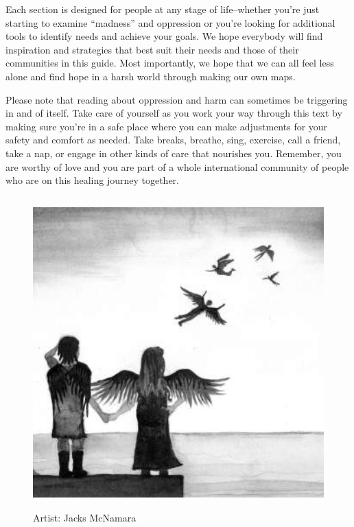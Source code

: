 Each  section  is  designed  for  people  at  any  stage  of  life--whether  you’re  just starting to examine “madness” and oppression or you’re looking for additional tools  to  identify  needs  and  achieve  your  goals.  We  hope  everybody  will  find inspiration and strategies that best suit their needs and those of their communities  in  this  guide.  Most  importantly,  we  hope  that  we  can  all  feel  less  alone and find hope in a harsh world through making our own maps.

Please  note  that  reading  about  oppression  and  harm  can  sometimes  be  triggering in and of itself. Take care of yourself as you work your way through this text by making sure you’re in a safe place where you can make adjustments for your safety and comfort as needed. Take breaks, breathe, sing, exercise, call a friend, take a nap, or engage in other kinds of care that nourishes you. Remember, you are worthy of love and you are part of a whole international community of people who are on this healing journey together.

\begin{figure}[h]
	\centering
	\includegraphics[height=12cm]{TeX_files/0-1.png}
	\caption{Artist: Jacks McNamara}
	\label{2-0}
\end{figure}
